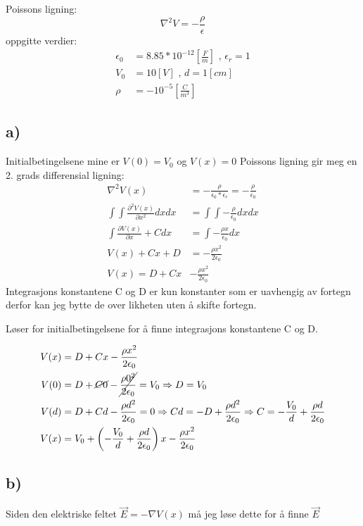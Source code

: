 \documentclass[a4paper,12pt,norsk]{article}
\begin{document}
Poissons ligning: $$\nabla^2V = -\frac{\rho}{\epsilon} $$
oppgitte verdier:
\begin{align*}
\epsilon_0 &= 8.85*10^{-12}\left[\frac{F}{m}\right] \text{ , } \epsilon_r = 1\\
V_0 &= 10[V] \text{ , } d = 1 [cm]\\
\rho &= -10^{-5}\left[\frac{C}{m^3}\right] 
\end{align*}

\subsection{a)}
Initialbetingelsene mine er $V(0) = V_0$ og $V(x) = 0$
Poissons ligning gir meg en 2. grads differensial ligning:
\begin{align*}
\nabla^2V(x) &= -\frac{\rho}{\epsilon_0 *\epsilon_r} = -\frac{\rho}{\epsilon_0}\\
\int\int \frac{\partial^2V(x)}{\partial{x^2}}dxdx &= \int\int -\frac{\rho}{\epsilon_0}dxdx \\
\int \frac{\partial V(x)}{\partial{x}} + C dx &= \int -\frac{\rho x}{\epsilon_0}dx\\
V(x) +Cx + D &= -\frac{\rho x^2}{2\epsilon_0}\\
V(x) = D + Cx &-\frac{\rho x^2}{2\epsilon_0}
\end{align*}
Integrasjons konstantene C og D er kun konstanter som er uavhengig av fortegn derfor kan jeg bytte de over likheten uten å skifte fortegn.

Løser for initialbetingelsene for å finne integrasjons konstantene C og D. 

\begin{align*}
V(x) &= D + Cx -\frac{\rho x^2}{2\epsilon_0}\\
V(0) &= D + \cancel{C0} -\cancel{\frac{\rho 0^2}{2\epsilon_0}} = V_0 \Rightarrow D = V_0\\
V(d) & = D + Cd -\frac{\rho d^2}{2\epsilon_0} = 0 \Rightarrow Cd = - D +\frac{\rho d^2}{2\epsilon_0} \Rightarrow C = -\frac{V_0}{d} + \frac{\rho d}{2\epsilon_0}\\
V(x) &= V_0 + \left( -\frac{V_0}{d} + \frac{\rho d}{2\epsilon_0} \right)x - \frac{\rho x^2}{2\epsilon_0}
\end{align*}

\subsection{b)}

Siden den elektriske feltet $\vec{E} = - \nabla V(x)$ må jeg løse dette for å finne $\vec{E}$
\end{document}
